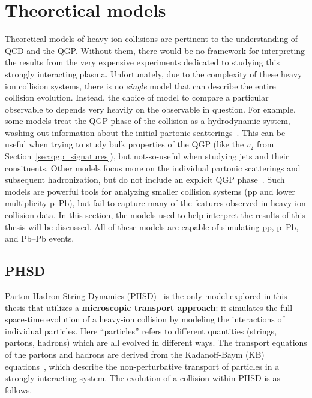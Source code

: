 \section{Theoretical models}
\label{sec:models}

Theoretical models of heavy ion collisions are pertinent to the understanding of QCD and the QGP. Without them, there would be no framework for interpreting the results from the very expensive experiments dedicated to studying this strongly interacting plasma. Unfortunately, due to the complexity of these heavy ion collision systems, there is no \textit{single} model that can describe the entire collision evolution. Instead, the choice of model to compare a particular observable to depends very heavily on the observable in question. For example, some models treat the QGP phase of the collision as a hydrodynamic system, washing out information about the initial partonic scatterings~\cite{EPOS}. This can be useful when trying to study bulk properties of the QGP (like the $v_2$ from Section~\ref{sec:qgp_signatures}), but not-so-useful when studying jets and their consituents. Other models focus more on the individual partonic scatterings and subsequent hadronization, but do not include an explicit QGP phase~\cite{Pythia, DPMJet}. Such models are powerful tools for analyzing smaller collision systems (pp and lower multiplicity p--Pb), but fail to capture many of the features observed in heavy ion collision data. In this section, the models used to help interpret the results of this thesis will be discussed. All of these models are capable of simulating pp, p--Pb, and Pb--Pb events.

\subsection{PHSD}
Parton-Hadron-String-Dynamics (PHSD)~\cite{PHSD1, PHSD2} is the only model explored in this thesis that utilizes a \textbf{microscopic transport approach}: it simulates the full space-time evolution of a heavy-ion collision by modeling the interactions of individual particles. Here ``particles'' refers to different quantities (strings, partons, hadrons) which are all evolved in different ways. The transport equations of the partons and hadrons are derived from the Kadanoff-Baym (KB) equations~\cite{KBEq}, which describe the non-perturbative transport of particles in a strongly interacting system. The evolution of a collision within PHSD is as follows.

